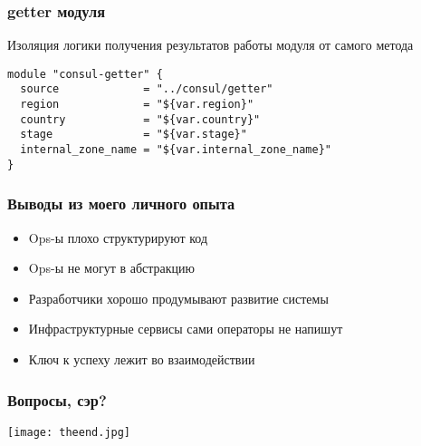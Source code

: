 \documentclass[mathserif,serif]{beamer}
\begin{document}
\begin{frame}[fragile]
	\frametitle{getter модуля}
	Изоляция логики получения результатов работы модуля от самого метода
	\begin{verbatim}
module "consul-getter" {
  source             = "../consul/getter"
  region             = "${var.region}"
  country            = "${var.country}"
  stage              = "${var.stage}"
  internal_zone_name = "${var.internal_zone_name}"
}
	\end{verbatim}
\end{frame}

\begin{frame}
	\frametitle{Выводы из моего личного опыта}
	\begin{itemize}
		\item{Ops-ы плохо структурируют код}
		\item{Ops-ы не могут в абстракцию}
		\item{Разработчики хорошо продумывают развитие системы}
		\item{Инфраструктурные сервисы сами операторы не напишут}
		\item{Ключ к успеху лежит во взаимодействии}
	\end{itemize}
\end{frame}

\begin{frame}
	\frametitle{Вопросы, сэр?}
	\texttt{[image: theend.jpg]}
\end{frame}
\end{document}
